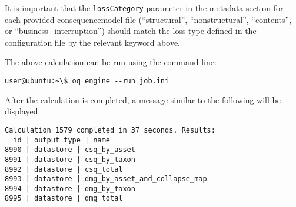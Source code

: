 It is important that the \Verb+lossCategory+ parameter in the metadata section
for each provided \gls{consequencemodel} file (``structural'', ``nonstructural'',
``contents'', or ``business\_interruption'') should match the loss type
defined in the configuration file by the relevant keyword above.

The above calculation can be run using the command line:

\begin{verbatim}
user@ubuntu:~\$ oq engine --run job.ini
\end{verbatim}

After the calculation is completed, a message similar to the following will be
displayed:

\begin{verbatim}
Calculation 1579 completed in 37 seconds. Results:
  id | output_type | name
8990 | datastore | csq_by_asset
8991 | datastore | csq_by_taxon
8992 | datastore | csq_total
8993 | datastore | dmg_by_asset_and_collapse_map
8994 | datastore | dmg_by_taxon
8995 | datastore | dmg_total
\end{verbatim}
